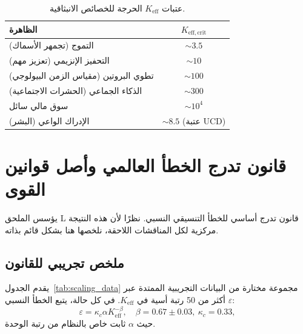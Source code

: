 \documentclass[11pt,a4paper]{article}
\theoremstyle{remark}
\newcommand{\Keff}{K_{\mathrm{eff}}}
\newcommand{\Keffcrit}{K_{\mathrm{eff},\text{crit}}}
\begin{document}
	\begin{table}[H]
		\centering
		\caption{عتبات \(\Keff\) الحرجة للخصائص الانبثاقية.}
		\label{tab:thresholds}
		\begin{tabular}{l c}
			\toprule
			\textbf{الظاهرة} & \(\Keffcrit\) \\
			\midrule
			التموج (تجمهر الأسماك) & \(\sim 3.5\) \\
			التحفيز الإنزيمي (تعزيز مهم) & \(\sim 10\) \\
			تطوي البروتين (مقياس الزمن البيولوجي) & \(\sim 100\) \\
			الذكاء الجماعي (الحشرات الاجتماعية) & \(\sim 300\) \\
			سوق مالي سائل & \(\sim 10^4\) \\
			الإدراك الواعي (البشر) & \(\sim 8.5\) (عتبة UCD) \\
			\bottomrule
		\end{tabular}
	\end{table}
	
	\section{قانون تدرج الخطأ العالمي وأصل قوانين القوى}
	\label{sec:scaling}
	
	يؤسس الملحق L قانون تدرج أساسي للخطأ التنسيقي النسبي. نظرًا لأن هذه النتيجة مركزية لكل المناقشات اللاحقة، نلخصها هنا بشكل قائم بذاته.
	
	\subsection{ملخص تجريبي للقانون}
	
	يقدم الجدول~\ref{tab:scaling_data} مجموعة مختارة من البيانات التجريبية الممتدة عبر أكثر من 50 رتبة أسية في \(\Keff\). في كل حالة، يتبع الخطأ النسبي \(\varepsilon\):
	\begin{equation}
		\varepsilon = \kappa_c \alpha \Keff^{-\beta}, \quad \beta = 0.67 \pm 0.03,\ \kappa_c = 0.33,
		\label{eq:error-scaling}
	\end{equation}
	حيث \(\alpha\) ثابت خاص بالنظام من رتبة الوحدة.
	
\end{document}
